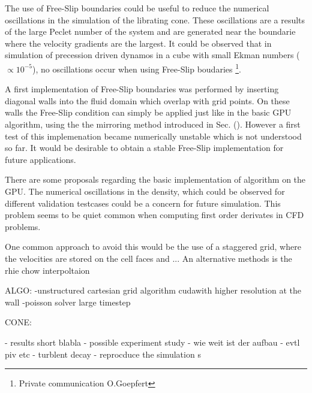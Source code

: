 The use of Free-Slip boundaries could be useful to reduce the numerical oscillations in the simulation of the librating cone.
These oscillations are a results of the large Peclet number of the system and are generated
near the boundarie where the velocity gradients are the largest.
It could be observed that in simulation of precession driven dynamos in a cube with small Ekman numbers ($\propto 10^{-5}$),
no oscillations occur when using Free-Slip boudaries \footnote{Private communication O.Goepfert}.

A first implementation of Free-Slip boundaries was performed
by inserting diagonal walls into the fluid domain which overlap with grid points.
On these walls the Free-Slip condition can simply be applied just like in the basic GPU algorithm,
using the the mirroring method introduced in Sec. ().
However a first test of this implemenation became numerically unstable which is not understood so far.
It would be desirable to obtain a stable  Free-Slip implementation for future applications.


There are some proposals regarding the basic implementation of algorithm on the GPU.
The numerical oscillations in the density, which could be observed for different validation testcases
could be a concern for future simulation.
This problem seems to be quiet common when computing first order derivates in CFD problems.

One common approach to avoid this would be the use of a staggered grid, where the velocities
are stored on the cell faces and ...
An alternative methods is the rhie chow interpoltaion

ALGO:
-unstructured cartesian grid algorithm cudawith higher resolution at the wall
-poisson solver large timestep

CONE:

- results short blabla
- possible experiment study
- wie weit ist der aufbau
- evtl piv etc
- turblent decay
- reprocduce the simulation s
